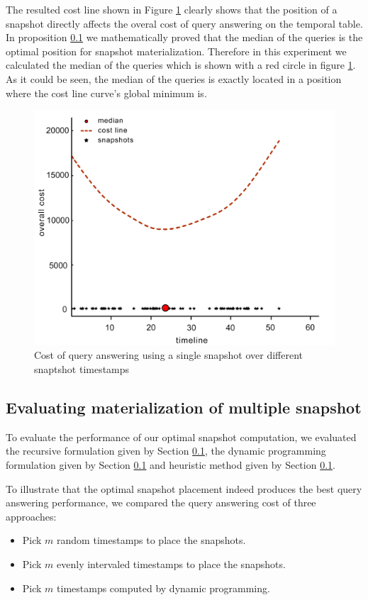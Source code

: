 The resulted cost line shown in Figure \ref{fig:single_snapshot} clearly shows that the position of a snapshot directly affects the overal cost of query answering on the temporal table. In proposition \ref{} we mathematically proved that the median of the queries is the optimal position for snapshot materialization. Therefore in this experiment we calculated the median of the queries which is shown with a red circle in figure \ref{fig:single_snapshot}. As it could be seen, the median of the queries is exactly located in a position where the cost line curve's global minimum is.
\begin{figure}
	\centering
	\includegraphics[width=\textwidth]{figs/single_snapshot.jpg}
	\caption{Cost of query answering using a single snapshot over different snaptshot timestamps}
	\label{fig:single_snapshot}
\end{figure} 

\subsection{Evaluating materialization of multiple snapshot}
To evaluate the performance of our optimal snapshot computation, we evaluated the recursive formulation given
by Section \ref{}, the dynamic programming formulation given by Section \ref{} and heuristic method given by Section \ref{}. 

To illustrate that the optimal snapshot placement indeed produces the best query answering performance, we compared the query answering cost of three approaches:
\begin{itemize}
	\item Pick $m$ random timestamps to place the snapshots.
	\item Pick $m$ evenly intervaled timestamps to place the snapshots.
	\item Pick $m$ timestamps computed by dynamic programming.
\end{itemize}

